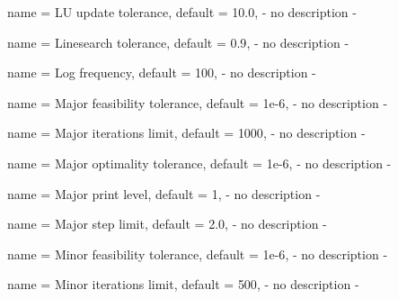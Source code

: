 \begin{parameter}{
    name    = {LU update tolerance},
    default = {10.0},
}
- no description -
\end{parameter}

\begin{parameter}{
    name    = {Linesearch tolerance},
    default = {0.9},
}
- no description -
\end{parameter}

\begin{parameter}{
    name    = {Log frequency},
    default = {100},
}
- no description -
\end{parameter}

\begin{parameter}{
    name    = {Major feasibility tolerance},
    default = {1e-6},
}
- no description -
\end{parameter}

\begin{parameter}{
    name    = {Major iterations limit},
    default = {1000},
}
- no description -
\end{parameter}

\begin{parameter}{
    name    = {Major optimality tolerance},
    default = {1e-6},
}
- no description -
\end{parameter}

\begin{parameter}{
    name    = {Major print level},
    default = {1},
}
- no description -
\end{parameter}

\begin{parameter}{
    name    = {Major step limit},
    default = {2.0},
}
- no description -
\end{parameter}

\begin{parameter}{
    name    = {Minor feasibility tolerance},
    default = {1e-6},
}
- no description -
\end{parameter}

\begin{parameter}{
    name    = {Minor iterations limit},
    default = {500},
}
- no description -
\end{parameter}

